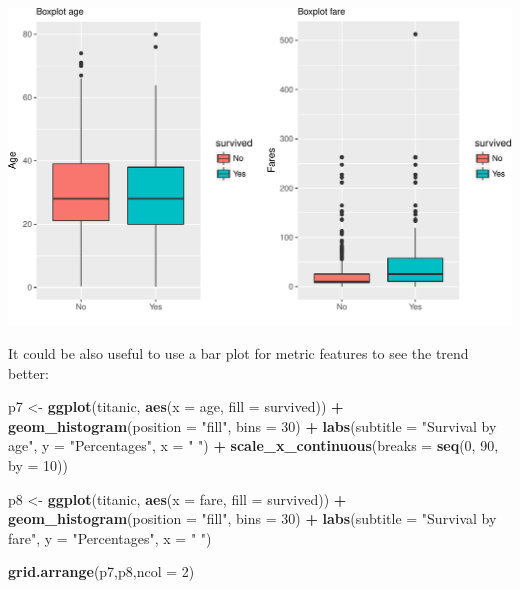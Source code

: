 \documentclass[12,]{article}
\newenvironment{Shaded}{\begin{snugshade}}{\end{snugshade}}
\newcommand{\KeywordTok}[1]{\textcolor[rgb]{0.13,0.29,0.53}{\textbf{#1}}}
\newcommand{\DataTypeTok}[1]{\textcolor[rgb]{0.13,0.29,0.53}{#1}}
\newcommand{\DecValTok}[1]{\textcolor[rgb]{0.00,0.00,0.81}{#1}}
\newcommand{\StringTok}[1]{\textcolor[rgb]{0.31,0.60,0.02}{#1}}
\newcommand{\OperatorTok}[1]{\textcolor[rgb]{0.81,0.36,0.00}{\textbf{#1}}}
\newcommand{\NormalTok}[1]{#1}
\begin{document}
\includegraphics{Seminararbeit_1_Gruppe_2_files/figure-latex/unnamed-chunk-8-1.pdf}

It could be also useful to use a bar plot for metric features to see the
trend better:

\begin{Shaded}
\begin{Highlighting}[]
\NormalTok{p7 <-}\StringTok{ }\KeywordTok{ggplot}\NormalTok{(titanic, }\KeywordTok{aes}\NormalTok{(}\DataTypeTok{x =}\NormalTok{ age, }\DataTypeTok{fill =}\NormalTok{ survived)) }\OperatorTok{+}\StringTok{ }
\StringTok{    }\KeywordTok{geom_histogram}\NormalTok{(}\DataTypeTok{position =} \StringTok{"fill"}\NormalTok{, }\DataTypeTok{bins =} \DecValTok{30}\NormalTok{) }\OperatorTok{+}
\StringTok{    }\KeywordTok{labs}\NormalTok{(}\DataTypeTok{subtitle =} \StringTok{"Survival by age"}\NormalTok{, }\DataTypeTok{y =} \StringTok{"Percentages"}\NormalTok{, }\DataTypeTok{x =} \StringTok{" "}\NormalTok{) }\OperatorTok{+}
\StringTok{    }\KeywordTok{scale_x_continuous}\NormalTok{(}\DataTypeTok{breaks =} \KeywordTok{seq}\NormalTok{(}\DecValTok{0}\NormalTok{, }\DecValTok{90}\NormalTok{, }\DataTypeTok{by =} \DecValTok{10}\NormalTok{))}

\NormalTok{p8 <-}\StringTok{ }\KeywordTok{ggplot}\NormalTok{(titanic, }\KeywordTok{aes}\NormalTok{(}\DataTypeTok{x =}\NormalTok{ fare, }\DataTypeTok{fill =}\NormalTok{ survived)) }\OperatorTok{+}\StringTok{ }
\StringTok{    }\KeywordTok{geom_histogram}\NormalTok{(}\DataTypeTok{position =} \StringTok{"fill"}\NormalTok{, }\DataTypeTok{bins =} \DecValTok{30}\NormalTok{) }\OperatorTok{+}
\StringTok{    }\KeywordTok{labs}\NormalTok{(}\DataTypeTok{subtitle =} \StringTok{"Survival by fare"}\NormalTok{, }
         \DataTypeTok{y =} \StringTok{"Percentages"}\NormalTok{, }\DataTypeTok{x =} \StringTok{" "}\NormalTok{) }

\KeywordTok{grid.arrange}\NormalTok{(p7,p8,}\DataTypeTok{ncol =} \DecValTok{2}\NormalTok{)}
\end{Highlighting}
\end{Shaded}
\end{document}

